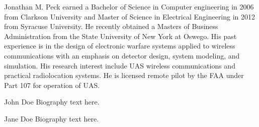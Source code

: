 \documentclass[journal,transmag]{IEEEtran}
\begin{document}
\begin{IEEEbiography}{Jonathan M. Peck}
earned a Bachelor of Science in Computer engineering in 2006 from Clarkson University and Master of Science in Electrical Engineering in 2012 from Syracuse University. He recently obtained a Masters of Business Administration from the State University of New York at Oswego. His past experience is in the design of electronic warfare systems applied to wireless communications with an emphasis on detector design, system modeling, and simulation. His research interest include UAS wireless communications and practical radiolocation systems. He is licensed remote pilot by the FAA under Part 107 for operation of UAS.
\end{IEEEbiography}

\begin{IEEEbiographynophoto}{John Doe}
Biography text here.
\end{IEEEbiographynophoto}


\begin{IEEEbiographynophoto}{Jane Doe}
Biography text here.
\end{IEEEbiographynophoto}






\end{document}
